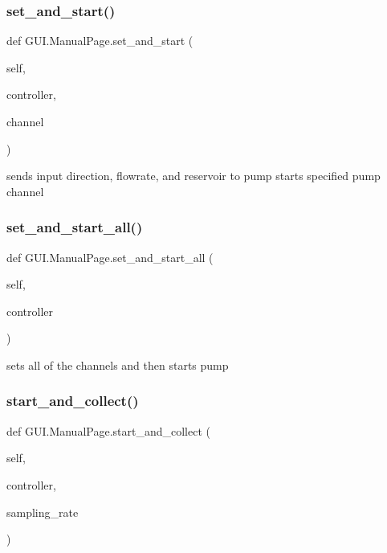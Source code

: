 \mbox{\label{class_g_u_i_1_1_manual_page_af00991d5107b8b590f222c7c5a82c8d9}} 
\subsubsection{\texorpdfstring{set\_and\_start()}{set\_and\_start()}}
{\footnotesize\ttfamily def G\+U\+I.\+Manual\+Page.\+set\+\_\+and\+\_\+start (\begin{DoxyParamCaption}\item[{}]{self,  }\item[{}]{controller,  }\item[{}]{channel }\end{DoxyParamCaption})}

\begin{DoxyVerb}sends input direction, flowrate, and reservoir to pump
starts specified pump channel
\end{DoxyVerb}
 \mbox{\label{class_g_u_i_1_1_manual_page_a9c7c4c6f8b8811f2c88841419faa2cc2}} 
\subsubsection{\texorpdfstring{set\_and\_start\_all()}{set\_and\_start\_all()}}
{\footnotesize\ttfamily def G\+U\+I.\+Manual\+Page.\+set\+\_\+and\+\_\+start\+\_\+all (\begin{DoxyParamCaption}\item[{}]{self,  }\item[{}]{controller }\end{DoxyParamCaption})}

\begin{DoxyVerb}sets all of the channels and then starts pump
\end{DoxyVerb}
 \mbox{\label{class_g_u_i_1_1_manual_page_afa50301e19523a6a4151c2c2c6d9a969}} 
\subsubsection{\texorpdfstring{start\_and\_collect()}{start\_and\_collect()}}
{\footnotesize\ttfamily def G\+U\+I.\+Manual\+Page.\+start\+\_\+and\+\_\+collect (\begin{DoxyParamCaption}\item[{}]{self,  }\item[{}]{controller,  }\item[{}]{sampling\+\_\+rate }\end{DoxyParamCaption})}

